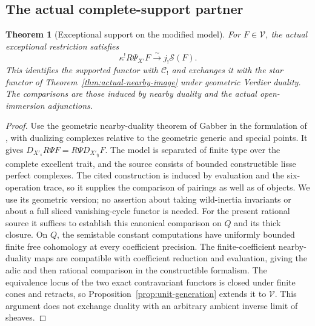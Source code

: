 \documentclass[11pt]{article}
\newtheorem{theorem}{Theorem}[section]
\theoremstyle{definition}
\theoremstyle{remark}
\begin{document}
\subsection{The actual complete-support partner}
\begin{theorem}[Exceptional support on the modified model]
\label{thm:actual-support-image}
For $F\in\mathcal V$, the actual exceptional restriction satisfies
\[
 \kappa^!R\Psi_{X'}F\xrightarrow{\sim}j_!\mathcal S(F).
\]
This identifies the supported functor with $\mathcal C_!$ and exchanges
it with the star functor of Theorem~\ref{thm:actual-nearby-image} under
geometric Verdier duality.  The comparisons are those induced by
nearby duality and the actual open-immersion adjunctions.
\end{theorem}
\begin{proof}
Use the geometric nearby-duality theorem of Gabber in the formulation
of \cite[Corollary 3.2, Remark 3.3]{LuZhengNearby}, with dualizing
complexes relative to the geometric generic and special points.
It gives $D_{X'_s}R\Psi F=R\Psi D_{X'_{\bar\eta}}F$.  The model is
separated of finite type over the complete excellent trait, and the
source consists of bounded constructible lisse perfect complexes.
The cited construction is induced by evaluation and the six-operation
trace, so it supplies the comparison of pairings as well as of objects.
We use its geometric version; no assertion about taking wild-inertia
invariants or about a full sliced vanishing-cycle functor is needed.
For the present rational source it suffices to establish this
canonical comparison on $Q$ and its thick closure.  On $Q$, the
semistable constant computations have uniformly bounded finite free
cohomology at every coefficient precision.  The finite-coefficient
nearby-duality maps are compatible with coefficient reduction and
evaluation, giving the adic and then rational comparison in the
constructible formalism.  The equivalence locus of the two exact
contravariant functors is closed under finite cones and retracts,
so Proposition~\ref{prop:unit-generation} extends it to $\mathcal V$.
This argument does not exchange duality with an arbitrary ambient
inverse limit of sheaves.


\end{proof}
\end{document}
